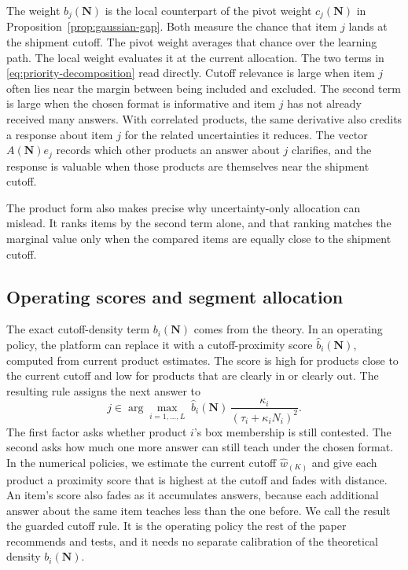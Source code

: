 \documentclass[11pt]{article}
\theoremstyle{definition}
\theoremstyle{remark}
\newcommand{\1}{\mathbf{1}}
\newcommand{\N}{\mathbf{N}}
\begin{document}
The weight \(b_j(\N)\) is the local counterpart of the pivot weight
\(c_j(\N)\) in Proposition~\ref{prop:gaussian-gap}. Both measure the
chance that item \(j\) lands at the shipment cutoff. The pivot weight
averages that chance over the learning path. The local weight evaluates
it at the current allocation. The two terms in
\eqref{eq:priority-decomposition} read directly. Cutoff relevance is
large when item \(j\) often lies near the margin between being included
and excluded. The second term is large when the chosen format is
informative and item \(j\) has not already received many
answers. With correlated products, the same derivative also credits a
response about item \(j\) for the related uncertainties it reduces. The vector \(A(\N)e_j\)
records which other products an answer about \(j\)
clarifies, and the response is valuable when those products are
themselves near the shipment cutoff.

The product form also makes precise why uncertainty-only allocation
can mislead. It ranks items by the second term alone, and that
ranking matches the marginal value only when the compared items
are equally close to the shipment cutoff.

\subsection{Operating scores and segment allocation}
\label{subsec:global-solver}

The exact cutoff-density term \(b_i(\N)\) comes from the theory. In an
operating policy, the platform can replace it with a cutoff-proximity
score \(\widehat b_i(\N)\), computed from current product estimates. The
score is high for products close to the current cutoff and low for
products that are clearly in or clearly out. The resulting rule assigns
the next answer to
\[
j\in\arg\max_{i=1,\ldots,L}\;
\widehat b_i(\N)\,
\frac{\kappa_i}{(\tau_i+\kappa_iN_i)^2}.
\]
The first factor asks whether product \(i\)'s box membership is still
contested. The second asks how much one more answer can still teach under
the chosen format. In the numerical policies, we estimate the current cutoff \(\hat
w_{(K)}\) and give each product a proximity score that is highest at the
cutoff and fades with distance. An item's score also fades as it accumulates answers,
because each additional answer about the same item teaches less than the
one before. We call the result the guarded cutoff rule. It is the operating policy the rest of the paper
recommends and tests, and it needs no separate calibration of the
theoretical density \(b_i(\N)\).
\end{document}
